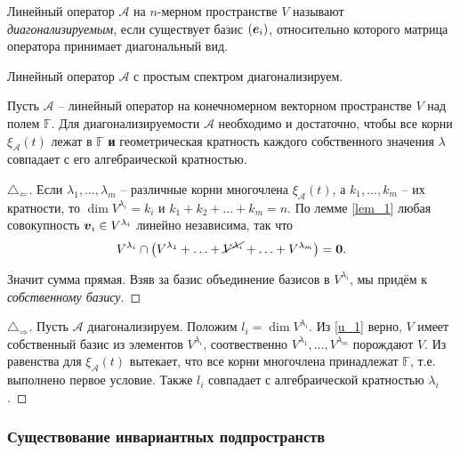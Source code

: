 \begin{to_def} 
    Линейный оператор $\mathcal A $ на $n $-мерном пространстве $V $ называют \textit{диагонализируемым}, если существует базис $(\mbox{\boldmath $e$}_i) $, относительно которого матрица оператора принимает диагональный вид. 
\end{to_def}

\begin{to_thr} 
    Линейный оператор $\mathcal A $ с простым спектром диагонализируем.
\end{to_thr}

\begin{to_thr} 
    Пусть $\mathcal A $ -- линейный оператор на конечномерном векторном пространстве $V $ над полем $\mathbb{F} $. Для диагонализируемости  $\mathcal A $ необходимо и достаточно, чтобы все корни $\xi_{\mathcal A} (t) $ лежат в $\mathbb{F} $  \textbf{и} геометрическая кратность каждого собственного значения $\lambda $ совпадает с его алгебраической кратностью.
\end{to_thr}

\begin{proof}[$\triangle_{\Leftarrow}$]
Если $\lambda_{1}, \ldots, \lambda_m $ -- различные корни многочлена $\xi_{\mathcal A} (t)$, а $k_{1}, \ldots, k_m $ -- их кратности, то $\dim V^{\lambda_i} = k_i$ и $k_{1} + k_{2} + \ldots + k_m = n$. По лемме \ref{lem_1} любая совокупность $\mbox{\boldmath $v$}_i \in V^{\lambda_i}$ линейно независима, так что
\begin{equation}
\label{u_1}
    V^{\lambda_i} \cap \left(V^{\lambda_{1}} + \ldots + \cancel{V^{\lambda_i}} + \ldots + V^{\lambda_m}\right) = \mbox{\boldmath $0$}.
\end{equation}

Значит сумма прямая. Взяв за базис объединение базисов в $V^{\lambda_i}$, мы придём к \textit{собственному базису}. 
\end{proof}

\begin{proof}[$\triangle_{\Rightarrow}$]
    Пусть $\mathcal A$ диагонализируем. Положим $l_i = \dim V^{\lambda_i}$. Из \ref{u_1} верно, $V$ имеет собственный базис из элементов $V^{\lambda_i}$, соотвественно $V^{\lambda_1}, \ldots, V^{\lambda_m}$ порождают $V$. 
    Из равенства для $\xi_{\mathcal A} (t)$ вытекает, что все корни многочлена принадлежат $\mathbb{F}$, т.е. выполнено первое условие. Также $l_i$ совпадает с алгебраической кратностью $\lambda_i$.
\end{proof}

\subsubsection{Существование инвариантных подпространств}


